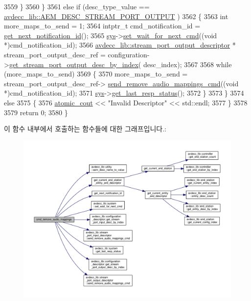 \begin{DoxyCode}
3559         \}
3560     \}
3561     \textcolor{keywordflow}{else} \textcolor{keywordflow}{if} (desc\_type\_value == \hyperlink{namespaceavdecc__lib_ac7b7d227e46bc72b63ee9e9aae15902fa2b2dca37bb2c945a2b37b02231650b48}{avdecc\_lib::AEM\_DESC\_STREAM\_PORT\_OUTPUT}
      )
3562     \{
3563         \textcolor{keywordtype}{int} more\_maps\_to\_send = 1;
3564         intptr\_t cmd\_notification\_id = \hyperlink{classcmd__line_a57486218387d1aa9d262eb7c176154ad}{get\_next\_notification\_id}();
3565         \hyperlink{classcmd__line_a485db4800e331cb4052c447fdf5d154e}{sys}->\hyperlink{classavdecc__lib_1_1system_a26b769584f10225077da47583edda33e}{set\_wait\_for\_next\_cmd}((\textcolor{keywordtype}{void} *)cmd\_notification\_id);
3566         \hyperlink{classavdecc__lib_1_1stream__port__output__descriptor}{avdecc\_lib::stream\_port\_output\_descriptor} * 
      stream\_port\_output\_desc\_ref = configuration->\hyperlink{classavdecc__lib_1_1configuration__descriptor_afc0e79843f9b98263f9be9d16197310b}{get\_stream\_port\_output\_desc\_by\_index}(
      desc\_index);
3567 
3568         \textcolor{keywordflow}{while} (more\_maps\_to\_send)
3569         \{
3570             more\_maps\_to\_send = stream\_port\_output\_desc\_ref->
      \hyperlink{classavdecc__lib_1_1stream__port__output__descriptor_ae22529f0333bc3efc10d16ecb3700cd5}{send\_remove\_audio\_mappings\_cmd}((\textcolor{keywordtype}{void} *)cmd\_notification\_id);
3571             \hyperlink{classcmd__line_a485db4800e331cb4052c447fdf5d154e}{sys}->\hyperlink{classavdecc__lib_1_1system_aa63e8d1a4e51f695cdcccc9340922407}{get\_last\_resp\_status}();
3572         \}
3573     \}
3574     \textcolor{keywordflow}{else}
3575     \{
3576         \hyperlink{cmd__line_8h_a0bc38ccc65c79ba06c6fcd7b4bf554c3}{atomic\_cout} << \textcolor{stringliteral}{"Invalid Descriptor"} << std::endl;
3577     \}
3578 
3579     \textcolor{keywordflow}{return} 0;
3580 \}
\end{DoxyCode}


이 함수 내부에서 호출하는 함수들에 대한 그래프입니다.\+:
\nopagebreak
\begin{figure}[H]
\begin{center}
\leavevmode
\includegraphics[width=350pt]{classcmd__line_aafc563b9d7f84f46d8bc9c55d8783578_cgraph}
\end{center}
\end{figure}





